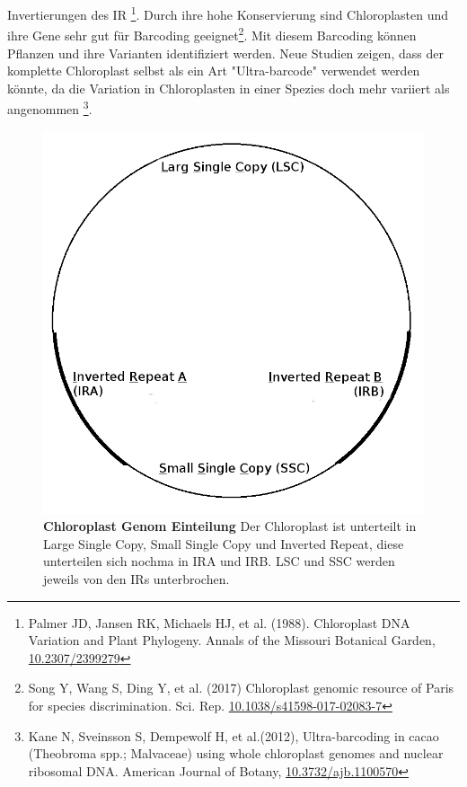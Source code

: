 \documentclass{scrartcl}
\begin{document}
Invertierungen des IR \footnote{Palmer JD, Jansen RK, Michaels HJ, et al. (1988).  Chloroplast DNA Variation and Plant Phylogeny. Annals of the Missouri Botanical Garden,  \url{10.2307/2399279}}. Durch ihre hohe Konservierung sind Chloroplasten und ihre Gene sehr gut für Barcoding geeignet\footnote{Song Y, Wang S, Ding Y, et al. (2017) Chloroplast genomic resource of Paris for species discrimination. Sci. Rep. \url{10.1038/s41598-017-02083-7}}. Mit diesem
Barcoding können Pflanzen und ihre Varianten identifiziert werden. Neue Studien zeigen, dass der komplette Chloroplast selbst als ein Art "Ultra-barcode"
verwendet werden könnte, da die Variation in Chloroplasten in einer Spezies doch mehr variiert als angenommen \footnote{Kane N, Sveinsson S, Dempewolf H, et al.(2012), Ultra-barcoding in cacao (Theobroma spp.; Malvaceae) using whole chloroplast genomes and nuclear ribosomal DNA. American Journal of Botany, \url{10.3732/ajb.1100570}}. 
\begin{figure}
\includegraphics[width=.9\linewidth]{./Chloroplast_1.png}
\caption[Chloroplast Genom Einteilung]{\textbf{Chloroplast Genom Einteilung} Der Chloroplast ist unterteilt in Large Single Copy, Small Single Copy und Inverted Repeat, diese unterteilen sich nochma in IRA und IRB. LSC und SSC werden jeweils von den IRs unterbrochen.}
\end{figure}
\end{document}
